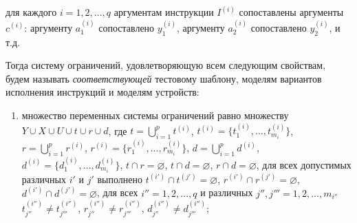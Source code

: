 для каждого $i = 1, 2, ..., q$ аргументам инструкции $I^{(i)}$ сопоставлены аргументы $c^{(i)}$: аргументу $a_1^{(i)}$ сопоставлено $y_1^{(i)}$, аргументу $a_2^{(i)}$ сопоставлено $y_2^{(i)}$, и т.д.

Тогда систему ограничений, удовлетворяющую всем следующим свойствам, будем называть \emph{соответствующей} тестовому шаблону, моделям вариантов исполнения инструкций и моделям устройств:
  \begin{enumerate}
    \item множество переменных системы ограничений равно множеству $Y \cup X \cup U \cup t \cup r \cup d$, где $t = \bigcup_{i=1}^p t^{(i)}$, $t^{(i)} = \{t_1^{(i)}, ..., t_{m_i}^{(i)}\}$, $r = \bigcup_{i=1}^p r^{(i)}$, $r^{(i)} = \{r_1^{(i)}, ..., r_{m_i}^{(i)}\}$, $d = \bigcup_{i=1}^p d^{(i)}$, $d^{(i)} = \{d_1^{(i)}, ..., d_{m_i}^{(i)}\}$, $t \cap r = \varnothing$, $t \cap d = \varnothing$, $r \cap d = \varnothing$, для всех допустимых различных $i'$ и $j'$ выполнено $t^{(i')} \cap t^{(j')} = \varnothing$, $r^{(i')} \cap r^{(j')} = \varnothing$, $d^{(i')} \cap d^{(j')} = \varnothing$, для всех $i'' = 1, 2, ..., q$ и различных $j'', j''' = 1, 2, ..., m_{i''}$ $t_{j''}^{(i'')} \neq t_{j'''}^{(i'')}$, $r_{j''}^{(i'')} \neq r_{j'''}^{(i'')}$, $d_{j''}^{(i'')} \neq d_{j'''}^{(i'')}$;


\end{enumerate}
